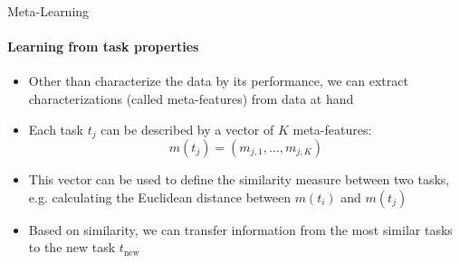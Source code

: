 \begin{frame}[c]{Meta-Learning}
\framesubtitle{Learning from task properties}

\begin{itemize}
    \item Other than characterize the data by its performance, we can extract characterizations (called \alert{meta-features}) from data at hand 
    \item Each task $t_j$ can be described by a vector of $K$ meta-features:
        \begin{equation*}
            m(t_j) = (m_{j, 1}, \dots, m_{j, K})
        \end{equation*}
    \item This vector can be used to define the similarity measure between two tasks, e.g. calculating the Euclidean distance between $m(t_i)$ and $m(t_j)$
    \item Based on similarity, we can transfer information from the most similar tasks to the new task $t_{\text{new}}$
    \end{itemize}


\end{frame}





